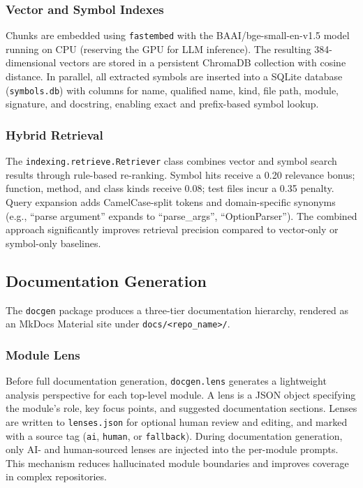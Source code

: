 \documentclass[10pt,twocolumn]{article}
\begin{document}
\subsubsection{Vector and Symbol Indexes}
Chunks are embedded using \texttt{fastembed} with the BAAI/bge-small-en-v1.5 model running on CPU (reserving the GPU for LLM inference). The resulting 384-dimensional vectors are stored in a persistent ChromaDB collection with cosine distance. In parallel, all extracted symbols are inserted into a SQLite database (\texttt{symbols.db}) with columns for name, qualified name, kind, file path, module, signature, and docstring, enabling exact and prefix-based symbol lookup.

\subsubsection{Hybrid Retrieval}
The \texttt{indexing.retrieve.Retriever} class combines vector and symbol search results through rule-based re-ranking. Symbol hits receive a 0.20 relevance bonus; function, method, and class kinds receive 0.08; test files incur a 0.35 penalty. Query expansion adds CamelCase-split tokens and domain-specific synonyms (e.g., ``parse argument'' expands to ``parse\_args'', ``OptionParser''). The combined approach significantly improves retrieval precision compared to vector-only or symbol-only baselines.

\subsection{Documentation Generation}

The \texttt{docgen} package produces a three-tier documentation hierarchy, rendered as an MkDocs Material site under \texttt{docs/<repo\_name>/}.

\subsubsection{Module Lens}
Before full documentation generation, \texttt{docgen.lens} generates a lightweight analysis perspective for each top-level module. A lens is a JSON object specifying the module's role, key focus points, and suggested documentation sections. Lenses are written to \texttt{lenses.json} for optional human review and editing, and marked with a source tag (\texttt{ai}, \texttt{human}, or \texttt{fallback}). During documentation generation, only AI- and human-sourced lenses are injected into the per-module prompts. This mechanism reduces hallucinated module boundaries and improves coverage in complex repositories.
\end{document}
